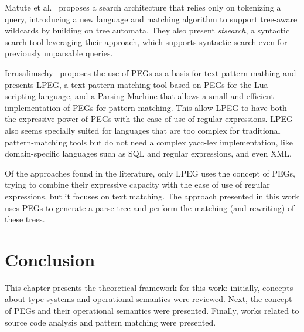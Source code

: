 Matute et al.~\cite{matute2024-sequence-tree-matching} proposes a search
architecture that relies only on tokenizing a query, introducing a new 
language and matching algorithm to support tree-aware wildcards by building
on tree automata. They also present \textit{stsearch}, a syntactic search
tool leveraging their approach, which supports syntactic search even for
previously unparsable queries.

Ierusalimschy~\cite{ierusalimschy2009-lpeg} proposes the use of PEGs as a basis
for text pattern-mathing and presents LPEG, a text pattern-matching tool based on 
PEGs for the Lua scripting language, and a Parsing Machine that allows a small 
and efficient implementation of PEGs for pattern matching. 
This allow LPEG to have both the expressive power of PEGs with the ease of use 
of regular expressions.
LPEG also seems specially suited for languages that are too complex for 
traditional pattern-matching tools but do not need a complex yacc-lex 
implementation, like domain-specific languages such as SQL and regular
expressions, and even XML.

Of the approaches found in the literature, only LPEG uses the concept of PEGs, 
trying to combine their expressive capacity with the ease of use of regular 
expressions, but it focuses on text matching. The approach presented in this 
work uses PEGs to generate a parse tree and perform the matching (and rewriting) 
of these trees.

\section{Conclusion}\label{sec:background-conclusion}

This chapter presents the theoretical framework for this work: initially, concepts 
about type systems and operational semantics were reviewed. Next, the concept 
of PEGs and their operational semantics were presented. Finally, works related 
to source code analysis and pattern matching were presented.

\cleardoublepage